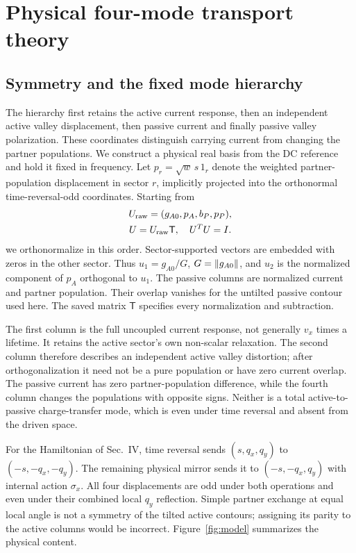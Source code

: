 \section{Physical four-mode transport theory}
\subsection{Symmetry and the fixed mode hierarchy}
The hierarchy first retains the active current response, then an independent active valley displacement, then passive current and finally passive valley polarization. These coordinates distinguish carrying current from changing the partner populations. We construct a physical real basis from the DC reference and hold it fixed in frequency. Let $p_r=\sqrt w\,s\,1_r$ denote the weighted partner-population displacement in sector $r$, implicitly projected into the orthonormal time-reversal-odd coordinates. Starting from
\begin{gather}
U_{\rm raw}=(g_{A0},p_A,b_P,p_P),\nonumber\\
U=U_{\rm raw}\mathsf T,\quad U^TU=I.\label{eq:basis}
\end{gather}
we orthonormalize in this order. Sector-supported vectors are embedded with zeros in the other sector. Thus $u_1=g_{A0}/G$, $G=\left\lVert g_{A0}\right\rVert$, and $u_2$ is the normalized component of $p_A$ orthogonal to $u_1$. The passive columns are normalized current and partner population. Their overlap vanishes for the untilted passive contour used here. The saved matrix $\mathsf T$ specifies every normalization and subtraction.

The first column is the full uncoupled current response, not generally $v_x$ times a lifetime. It retains the active sector's own non-scalar relaxation. The second column therefore describes an independent active valley distortion; after orthogonalization it need not be a pure population or have zero current overlap. The passive current has zero partner-population difference, while the fourth column changes the populations with opposite signs. Neither is a total active-to-passive charge-transfer mode, which is even under time reversal and absent from the driven space.

For the Hamiltonian of Sec.~IV, time reversal sends $(s,q_x,q_y)$ to $(-s,-q_x,-q_y)$. The remaining physical mirror sends it to $(-s,-q_x,q_y)$ with internal action $\sigma_x$. All four displacements are odd under both operations and even under their combined local $q_y$ reflection. Simple partner exchange at equal local angle is not a symmetry of the tilted active contours; assigning its parity to the active columns would be incorrect. Figure~\ref{fig:model} summarizes the physical content.

